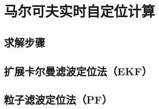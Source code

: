 \documentclass[../main.tex]{subfiles}
\begin{document}
\section{马尔可夫实时自定位计算}
\subsection{求解步骤}
\subsection{扩展卡尔曼滤波定位法（EKF）}

\subsection{粒子滤波定位法（PF）}
\end{document}
